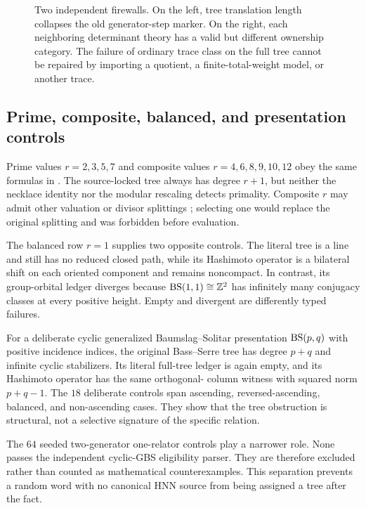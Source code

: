 \begin{figure}[t]
  \centering
  \resizebox{0.99\textwidth}{!}{}
  \caption{Two independent firewalls.  On the left, tree translation length
  collapses the old generator-step marker.  On the right, each neighboring
  determinant theory has a valid but different ownership category.  The
  failure of ordinary trace class on the full tree cannot be repaired by
  importing a quotient, a finite-total-weight model, or another trace.}
  \label{fig:marker-fredholm}
\end{figure}

\subsection{Prime, composite, balanced, and presentation controls}

Prime values $r=2,3,5,7$ and composite values
$r=4,6,8,9,10,12$ obey the same formulas in
.  The
source-locked tree always has degree $r+1$, but neither the necklace identity
nor the modular rescaling detects primality.  Composite $r$ may admit other
valuation or divisor splittings \citep{abbott2024valuations}; selecting one
would replace the original splitting and was forbidden before evaluation.

The balanced row $r=1$ supplies two opposite controls.  The literal tree is
a line and still has no reduced closed path, while its Hashimoto operator is
a bilateral shift on each oriented component and remains noncompact.  In
contrast, its group-orbital ledger diverges because
$\operatorname{BS}(1,1)\cong\mathbb Z^2$ has infinitely many conjugacy classes at every
positive height.  Empty and divergent are differently typed failures.

For a deliberate cyclic generalized Baumslag--Solitar presentation
$\operatorname{BS}(p,q)$ with positive incidence indices, the original Bass--Serre tree
has degree $p+q$ and infinite cyclic stabilizers.  Its literal full-tree
ledger is again empty, and its Hashimoto operator has the same orthogonal-
column witness with squared norm $p+q-1$.  The $18$ deliberate controls span
ascending, reversed-ascending, balanced, and non-ascending cases.  They show
that the tree obstruction is structural, not a selective signature of the
specific relation.

The $64$ seeded two-generator one-relator controls play a narrower role.
None passes the independent cyclic-GBS eligibility parser.  They are
therefore excluded rather than counted as mathematical counterexamples.
This separation prevents a random word with no canonical HNN source from
being assigned a tree after the fact.

